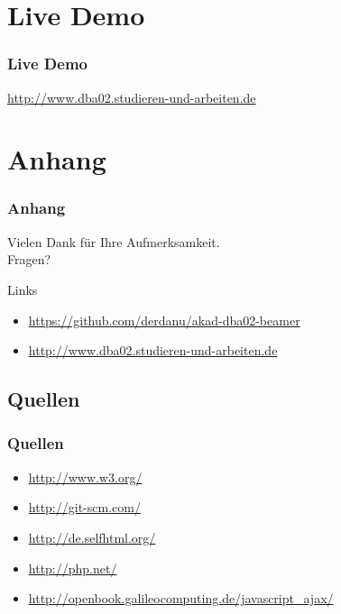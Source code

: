 \documentclass[xcolor=dvipsnames]{beamer}
\begin{document}
\section{Live Demo}
\begin{frame} %
  \frametitle{Live Demo} %
  \begin{center}  
      \Huge	\url{http://www.dba02.studieren-und-arbeiten.de}		
  \end{center}
\end{frame}


\section{Anhang}
\begin{frame}
  \frametitle{Anhang} %
	\begin{block}{}	
		\begin{center}
			Vielen Dank für Ihre Aufmerksamkeit. \\
			Fragen?
		\end{center}	
	\end{block}
	\begin{block}{Links}	
		\begin{itemize}
			\item \url{https://github.com/derdanu/akad-dba02-beamer}	
			\item \url{http://www.dba02.studieren-und-arbeiten.de}					
		\end{itemize}
	\end{block}
\end{frame}

\subsection{Quellen}
\begin{frame} %
  \frametitle{Quellen} %
 	\begin{itemize}
		\item \url{http://www.w3.org/}
		\item \url{http://git-scm.com/}
		\item \url{http://de.selfhtml.org/}
		\item \url{http://php.net/}
		\item \url{http://openbook.galileocomputing.de/javascript_ajax/}
	\end{itemize}
\end{frame}
\end{document}

